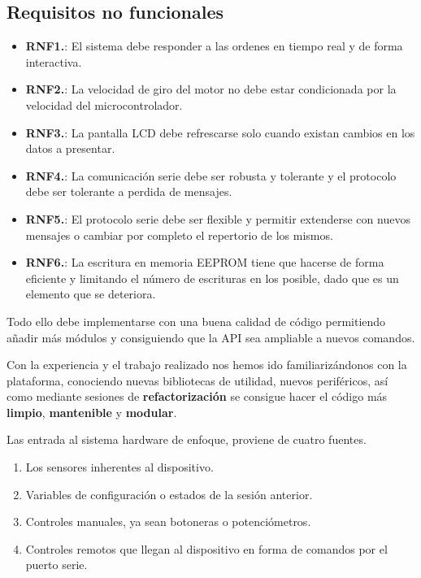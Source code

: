 \subsection{Requisitos no funcionales}

\begin{itemize}
		\item \textbf{RNF1.}: El sistema debe responder a las ordenes en tiempo real y de forma interactiva.
		
		\item \textbf{RNF2.}: La velocidad de giro del motor no debe estar condicionada por la velocidad del microcontrolador.
		
		\item \textbf{RNF3.}: La pantalla LCD debe refrescarse solo cuando existan cambios en los datos a presentar. 
		
		\item \textbf{RNF4.}: La comunicación serie debe ser robusta y tolerante y el protocolo debe ser tolerante a perdida de mensajes.
		
		\item \textbf{RNF5.}: El protocolo serie debe ser flexible y permitir extenderse con nuevos mensajes o cambiar por completo el repertorio de los mismos.
		
		\item \textbf{RNF6.}: La escritura en memoria EEPROM tiene que hacerse de forma eficiente y limitando el número de escrituras en los posible, dado que es un elemento que se deteriora.
		
\end{itemize}

Todo ello debe implementarse con una buena calidad de código permitiendo añadir más módulos y consiguiendo que la API sea ampliable a nuevos comandos.

Con la experiencia y el trabajo realizado nos hemos ido familiarizándonos con la plataforma, conociendo nuevas bibliotecas de utilidad, nuevos periféricos, así como mediante sesiones de \textbf{refactorización} se consigue hacer el código más \textbf{limpio}, \textbf{mantenible} y \textbf{modular}. 

Las entrada al sistema hardware de enfoque, proviene de cuatro fuentes.

\begin{enumerate}
	\item Los sensores inherentes al dispositivo.
	\item Variables de configuración o estados de la sesión anterior. 
	\item Controles manuales, ya sean botoneras o potenciómetros.
	\item Controles remotos que llegan al dispositivo en forma de comandos por el puerto serie.
\end{enumerate}

